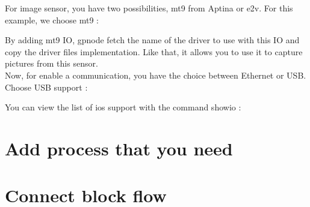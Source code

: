 \documentclass[10pt,a4paper]{article}
\begin{document}
For image sensor, you have two possibilities, mt9 from Aptina or e2v. For this example, we choose mt9 :


By adding mt9 IO, gpnode fetch the name of the driver to use with this IO and copy the driver files implementation. Like that, it allows you to use it to capture pictures from this sensor.\\

Now, for enable a communication, you have the choice between Ethernet or USB. Choose USB support :


You can view the list of ios support with the command showio :


\section{Add process that you need}




\section{Connect block flow}
\end{document}
